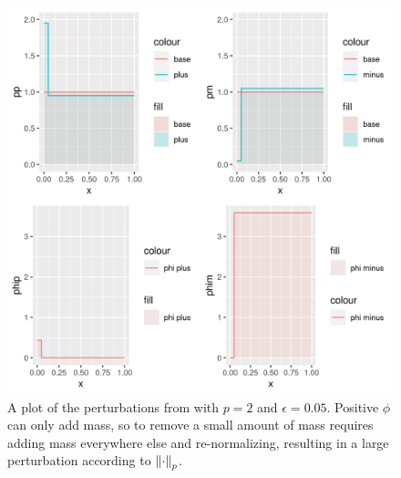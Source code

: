 \begin{ex}
%

\begin{figure}[h!]

\includegraphics[width=0.980\linewidth,height=0.980\linewidth]{static_images/positive_phi_example.png}
%
\caption{A plot of the perturbations from 
with $p=2$ and $\epsilon=0.05$.  Positive $\phi$ can only add mass, so to remove
a small amount of mass requires adding mass everywhere else and re-normalizing,
resulting in a large perturbation according to $\left\Vert\cdot\right\Vert_p$.}
%
\centering
\end{figure}


\end{ex}
